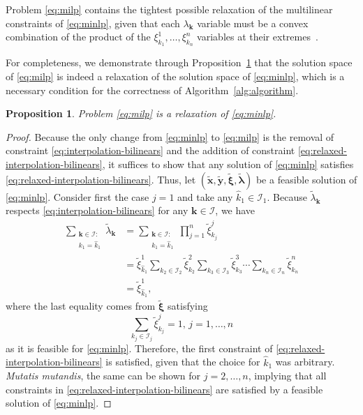 \documentclass[pdflatex,sn-mathphys-num]{sn-jnl}%
\newcommand{\new}[1]{#1}
\newtheorem{proposition}{Proposition}%
\begin{document}
\new{%
Problem \ref{eq:milp} contains the tightest possible relaxation of the multilinear constraints of \ref{eq:minlp}, given that each $\lambda_{\bm{k}}$ variable must be a convex combination of the product of the $\xi^1_{k_1},\ldots,\xi^n_{k_n}$ variables at their extremes~\citep{rikunConvexEnvelopeFormula1997,sundarPiecewisePolyhedralFormulations2021}.
}
For completeness, we demonstrate through Proposition~\ref{prop} that the solution space of \ref{eq:milp} is indeed a relaxation of the solution space of \ref{eq:minlp}, which is a necessary condition for the correctness of Algorithm~\ref{alg:algorithm}.

\begin{proposition}\label{prop}
    Problem \ref{eq:milp} is a relaxation of \ref{eq:minlp}.
\end{proposition}
\begin{proof}
    Because the only change from \ref{eq:minlp} to \ref{eq:milp} is the removal of constraint \eqref{eq:interpolation-bilinears} and the addition of constraint \eqref{eq:relaxed-interpolation-bilinears}, it suffices to show that any solution of \ref{eq:minlp} satisfies \eqref{eq:relaxed-interpolation-bilinears}.
    Thus, let $( \widetilde{\bm{x}}, \widetilde{\bm{y}}, \widetilde{\bm{\xi}},\widetilde{\bm{\lambda}} ) $ be a feasible solution of \ref{eq:minlp}.
    \new{%
    Consider first the case $j=1$ and take any $\hat{k}_1\in\mathcal{I}_1$.
    Because $\widetilde{\lambda}_{\bm{k}}$ respects \eqref{eq:interpolation-bilinears} for any $\bm{k}\in\mathcal{I}$, we have
    \begin{equation}
    \begin{aligned}
        \sum_{\substack{\bm{k} \in \mathcal{I}: \\ k_1 = \hat{k}_1}} \widetilde{\lambda}_{\bm{k}}
            &= \sum_{\substack{\bm{k} \in \mathcal{I}: \\ k_1 = \hat{k}_1}} \prod_{j=1}^{n} \widetilde{\xi}^j_{k_j} \\
            &= \widetilde{\xi}^1_{\hat{k}_1} \sum_{k_2 \in \mathcal{I}_2} \widetilde{\xi}^2_{k_2} \sum_{k_3 \in \mathcal{I}_3} \widetilde{\xi}^3_{k_3} \cdots \sum_{k_n \in \mathcal{I}_n}  \widetilde{\xi}^n_{k_n} \\
            &= \widetilde{\xi}^1_{\hat{k}_1},
    \end{aligned}
    \end{equation}
    where the last equality comes from $\widetilde{\bm{\xi}}$ satisfying
    \begin{equation}
	\sum_{k_j\in \mathcal{I}_j} \widetilde{\xi}^j_{k_j} = 1,\,j=1,\ldots,n
    \end{equation}
    as it is feasible for \ref{eq:minlp}.
    Therefore, the first constraint of \eqref{eq:relaxed-interpolation-bilinears} is satisfied, given that the choice for $\hat{k}_1$ was arbitrary.
    \emph{Mutatis mutandis}, the same can be shown for $j=2,\ldots,n$, implying that all constraints in \eqref{eq:relaxed-interpolation-bilinears} are satisfied by a feasible solution of \ref{eq:minlp}.
    }
\end{proof}
\end{document}

